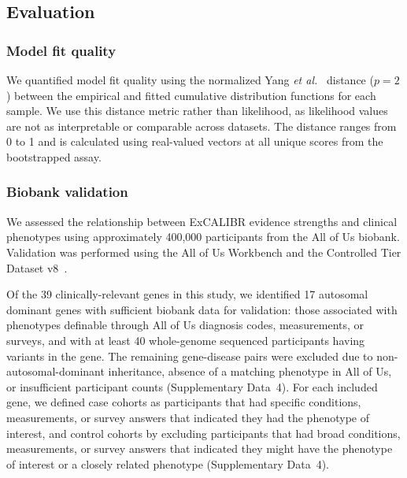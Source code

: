 \documentclass[11pt]{article}
\theoremstyle{plain}
\newcommand{\NumGenesCalibrated}{39 }
\newcommand{\excalibr}{ExCALIBR\xspace}
\begin{document}
\subsection*{Evaluation}

\subsubsection*{Model fit quality}
\label{sec:yang_dist}
We quantified model fit quality using the normalized Yang \textit{et al.}~\cite{yang2019new} distance ($p=2$) between the empirical and fitted cumulative distribution functions for each sample. We use this distance metric rather than likelihood, as likelihood values are not as interpretable or comparable across datasets. The distance ranges from 0 to 1 and is calculated using real-valued vectors at all unique scores from the bootstrapped assay.

\subsubsection*{Biobank validation}

\label{sec:OR_est}

We assessed the relationship between \excalibr evidence strengths and clinical phenotypes using approximately 400,000 participants from the All of Us biobank. Validation was performed using the All of Us Workbench and the Controlled Tier Dataset v8~\cite{AllofUs2019}.

Of the \NumGenesCalibrated clinically-relevant genes in this study, we identified 17 autosomal dominant genes with sufficient biobank data for validation: those associated with phenotypes definable through All of Us diagnosis codes, measurements, or surveys, and with at least 40 whole-genome sequenced participants having variants in the gene. The remaining gene-disease pairs were excluded due to non-autosomal-dominant inheritance, absence of a matching phenotype in All of Us, or insufficient participant counts (Supplementary Data~4). For each included gene, we defined case cohorts as participants that had specific conditions, measurements, or survey answers that indicated they had the phenotype of interest, and control cohorts by excluding participants that had broad conditions, measurements, or survey answers that indicated they might have the phenotype of interest or a closely related phenotype (Supplementary Data~4).
\end{document}
